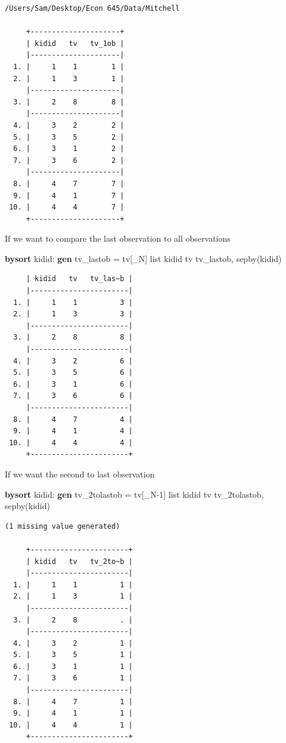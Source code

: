 \documentclass[
]{book}
\newenvironment{Shaded}{\begin{snugshade}}{\end{snugshade}}
\newcommand{\KeywordTok}[1]{\textcolor[rgb]{0.13,0.29,0.53}{\textbf{#1}}}
\newcommand{\NormalTok}[1]{#1}
\newcommand{\OtherTok}[1]{\textcolor[rgb]{0.56,0.35,0.01}{#1}}
\begin{document}
\begin{verbatim}
/Users/Sam/Desktop/Econ 645/Data/Mitchell

     +---------------------+
     | kidid   tv   tv_1ob |
     |---------------------|
  1. |     1    1        1 |
  2. |     1    3        1 |
     |---------------------|
  3. |     2    8        8 |
     |---------------------|
  4. |     3    2        2 |
  5. |     3    5        2 |
  6. |     3    1        2 |
  7. |     3    6        2 |
     |---------------------|
  8. |     4    7        7 |
  9. |     4    1        7 |
 10. |     4    4        7 |
     +---------------------+
\end{verbatim}

If we want to compare the last observation to all observations

\begin{Shaded}
\begin{Highlighting}[]
\KeywordTok{bysort}\NormalTok{ kidid: }\KeywordTok{gen}\NormalTok{ tv\_lastob = tv[\_N]}
\OtherTok{list}\NormalTok{ kidid tv tv\_lastob, sepby(kidid)}
\end{Highlighting}
\end{Shaded}

\begin{verbatim}
     | kidid   tv   tv_las~b |
     |-----------------------|
  1. |     1    1          3 |
  2. |     1    3          3 |
     |-----------------------|
  3. |     2    8          8 |
     |-----------------------|
  4. |     3    2          6 |
  5. |     3    5          6 |
  6. |     3    1          6 |
  7. |     3    6          6 |
     |-----------------------|
  8. |     4    7          4 |
  9. |     4    1          4 |
 10. |     4    4          4 |
     +-----------------------+
\end{verbatim}

If we want the second to last observation

\begin{Shaded}
\begin{Highlighting}[]
\KeywordTok{bysort}\NormalTok{ kidid: }\KeywordTok{gen}\NormalTok{ tv\_2tolastob = tv[\_N{-}1]}
\OtherTok{list}\NormalTok{ kidid tv tv\_2tolastob, sepby(kidid)}
\end{Highlighting}
\end{Shaded}

\begin{verbatim}
(1 missing value generated)

     +-----------------------+
     | kidid   tv   tv_2to~b |
     |-----------------------|
  1. |     1    1          1 |
  2. |     1    3          1 |
     |-----------------------|
  3. |     2    8          . |
     |-----------------------|
  4. |     3    2          1 |
  5. |     3    5          1 |
  6. |     3    1          1 |
  7. |     3    6          1 |
     |-----------------------|
  8. |     4    7          1 |
  9. |     4    1          1 |
 10. |     4    4          1 |
     +-----------------------+
\end{verbatim}
\end{document}
